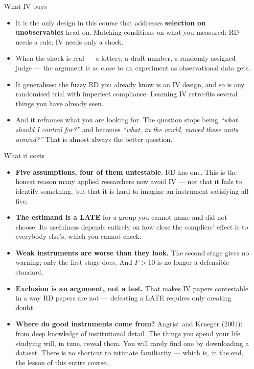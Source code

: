 \documentclass[
  11pt,
  ignorenonframetext,
  aspectratio=169,
]{beamer}
\providecommand{\tightlist}{%
  \setlength{\itemsep}{0pt}\setlength{\parskip}{0pt}}
\begin{document}
\begin{frame}{What IV buys}
\protect{}\label{what-iv-buys}
\begin{itemize}
\tightlist
\item
  It is the only design in this course that addresses \textbf{selection
  on unobservables} head-on. Matching conditions on what you measured;
  RD needs a rule; IV needs only a shock.
\item
  When the shock is real --- a lottery, a draft number, a randomly
  assigned judge --- the argument is as close to an experiment as
  observational data gets.
\item
  It generalises: the fuzzy RD you already know is an IV design, and so
  is any randomised trial with imperfect compliance. Learning IV
  retro-fits several things you have already seen.
\item
  And it reframes what you are looking for. The question stops being
  \emph{``what should I control for?''} and becomes \emph{``what, in the
  world, moved these units around?''} That is almost always the better
  question.
\end{itemize}
\end{frame}

\begin{frame}{What it costs}
\protect{}\label{what-it-costs}
\begin{itemize}
\tightlist
\item
  \textbf{Five assumptions, four of them untestable.} RD has one. This
  is the honest reason many applied researchers now avoid IV --- not
  that it fails to identify something, but that it is hard to imagine an
  instrument satisfying all five.
\item
  \textbf{The estimand is a LATE} for a group you cannot name and did
  not choose. Its usefulness depends entirely on how close the
  compliers' effect is to everybody else's, which you cannot check.
\item
  \textbf{Weak instruments are worse than they look.} The second stage
  gives no warning; only the first stage does. And \(F > 10\) is no
  longer a defensible standard.
\item
  \textbf{Exclusion is an argument, not a test.} That makes IV papers
  contestable in a way RD papers are not --- defeating a LATE requires
  only creating doubt.
\end{itemize}

\vspace{0.3em}

\begin{itemize}
\tightlist
\item
  \textbf{Where do good instruments come from?} Angrist and Krueger
  (2001): from deep knowledge of institutional detail. The things you
  spend your life studying will, in time, reveal them. You will rarely
  find one by downloading a dataset. There is no shortcut to intimate
  familiarity --- which is, in the end, the lesson of this entire
  course.
\end{itemize}
\end{frame}
\end{document}
